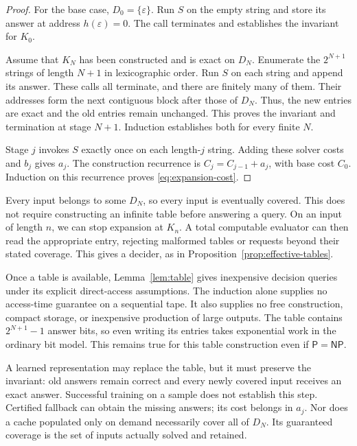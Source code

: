 \documentclass[11pt,a4paper]{article}
\numberwithin{equation}{section}
\newcommand{\Pclass}{\mathsf{P}}
\newcommand{\NPclass}{\mathsf{NP}}
\theoremstyle{plain}
\theoremstyle{definition}
\theoremstyle{remark}
\begin{document}
\begin{proof}
For the base case, $D_0=\{\varepsilon\}$. Run $S$ on the empty string and store its answer at address $h(\varepsilon)=0$. The call terminates and establishes the invariant for $K_0$.

Assume that $K_N$ has been constructed and is exact on $D_N$. Enumerate the $2^{N+1}$ strings of length $N+1$ in lexicographic order. Run $S$ on each string and append its answer. These calls all terminate, and there are finitely many of them. Their addresses form the next contiguous block after those of $D_N$. Thus, the new entries are exact and the old entries remain unchanged. This proves the invariant and termination at stage $N+1$. Induction establishes both for every finite $N$.

Stage $j$ invokes $S$ exactly once on each length-$j$ string. Adding these solver costs and $b_j$ gives $a_j$. The construction recurrence is $C_j=C_{j-1}+a_j$, with base cost $C_0$. Induction on this recurrence proves \eqref{eq:expansion-cost}.
\end{proof}

Every input belongs to some $D_N$, so every input is eventually covered. This does not require constructing an infinite table before answering a query. On an input of length $n$, we can stop expansion at $K_n$. A total computable evaluator can then read the appropriate entry, rejecting malformed tables or requests beyond their stated coverage. This gives a decider, as in Proposition~\ref{prop:effective-tables}.

Once a table is available, Lemma~\ref{lem:table} gives inexpensive decision queries under its explicit direct-access assumptions. The induction alone supplies no access-time guarantee on a sequential tape. It also supplies no free construction, compact storage, or inexpensive production of large outputs. The table contains $2^{N+1}-1$ answer bits, so even writing its entries takes exponential work in the ordinary bit model. This remains true for this table construction even if $\Pclass=\NPclass$.

A learned representation may replace the table, but it must preserve the invariant: old answers remain correct and every newly covered input receives an exact answer. Successful training on a sample does not establish this step. Certified fallback can obtain the missing answers; its cost belongs in $a_j$. Nor does a cache populated only on demand necessarily cover all of $D_N$. Its guaranteed coverage is the set of inputs actually solved and retained.
\end{document}
